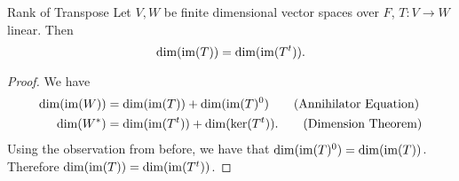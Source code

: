 \documentclass[class=article, crop=false]{standalone}
\begin{document}
  \begin{theorem}{Rank of Transpose}
    Let $V, W$ be finite dimensional vector spaces over $F$, $T\colon V\to W$ linear. Then
    \[
      \dim(\operatorname{im}(T)) = \dim(\operatorname{im}(T^t)).
    \]
  \end{theorem}
  \begin{proof}
    We have
    \begin{align*}
      \dim(\operatorname{im}(W)) &= \dim(\operatorname{im}(T)) + \dim(\operatorname{im}(T)^0) \tag{Annihilator Equation} \\
      \dim(W^*) &= \dim(\operatorname{im}(T^t)) + \dim(\ker(T^t)). \tag{Dimension Theorem}
    \end{align*}
    Using the observation from before, we have that $\dim(\operatorname{im}(T)^0) = \dim(\operatorname{im}(T))$. Therefore $\dim(\operatorname{im}(T)) = \dim(\operatorname{im}(T^t))$.
  \end{proof}
\end{document}
